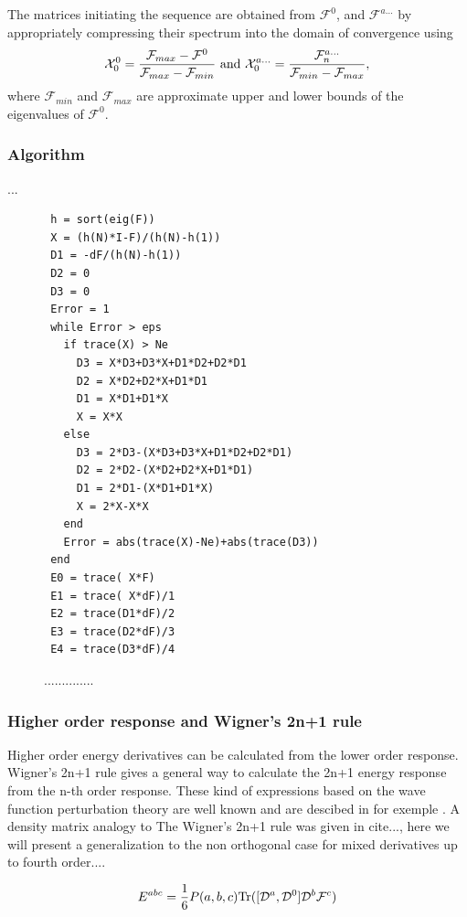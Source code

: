 \documentclass[prl,aps,twocolumn,showpacs,twocolumngrid,superbib]{revtex4}
\def\Tr{{\rm Tr}}
\def\F{\mathcal{F}}
\def\D{\mathcal{D}}
\def\X{\mathcal{X}}
\begin{document}
The matrices initiating the sequence are obtained from $\F^0$,
and $\F^{a\ldots}$ by appropriately
compressing their spectrum into the domain of convergence
\cite{ANiklasson02A} using
\begin{equation}
  \X^0_{0}=\frac{\F_{max}-\F^0}{\F_{max}-\F_{min}}~{\rm and}~
  \X^{a\ldots}_{0}=\frac{\F^{a\ldots}_{n}}{\F_{min}-\F_{max}},
\end{equation}
where $\F_{min}$ and $\F_{max}$ are approximate upper and lower 
bounds of the eigenvalues of $\F^0$.



\subsubsection{Algorithm}
...\\
\begin{figure}[htbp]
  \centering
  \caption{\protect
    ..............
  }\label{fig:algo}
\begin{verbatim}
 h = sort(eig(F))
 X = (h(N)*I-F)/(h(N)-h(1))
 D1 = -dF/(h(N)-h(1))
 D2 = 0
 D3 = 0
 Error = 1
 while Error > eps
   if trace(X) > Ne
     D3 = X*D3+D3*X+D1*D2+D2*D1
     D2 = X*D2+D2*X+D1*D1
     D1 = X*D1+D1*X
     X = X*X
   else
     D3 = 2*D3-(X*D3+D3*X+D1*D2+D2*D1)
     D2 = 2*D2-(X*D2+D2*X+D1*D1)
     D1 = 2*D1-(X*D1+D1*X)
     X = 2*X-X*X
   end
   Error = abs(trace(X)-Ne)+abs(trace(D3))
 end
 E0 = trace( X*F)
 E1 = trace( X*dF)/1
 E2 = trace(D1*dF)/2
 E3 = trace(D2*dF)/3
 E4 = trace(D3*dF)/4
\end{verbatim}
\end{figure}


\subsubsection{Higher order response and Wigner's 2n+1 rule }
Higher order energy derivatives can be calculated from the lower
order response. Wigner's 2n+1 rule gives a general way to calculate the 2n+1
energy response from the n-th order response. These kind of expressions
based on the wave function perturbation theory are well known and are 
descibed in for exemple \cite{Dupuis_1991}.
A density matrix analogy to 
The Wigner's 2n+1 rule was given in cite{...}, here we will present
a generalization to the non orthogonal case for mixed derivatives 
up to fourth order....



\begin{equation}
  E^{abc}=\frac{1}{6}P(a,b,c)\Tr([\D^a,\D^0]\D^b\F^c)
\end{equation}
\end{document}
